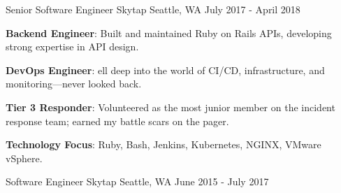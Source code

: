 \begin{cventries}
  \cventry
    {Senior Software Engineer} %
    {Skytap} %
    {Seattle, WA} %
    {July 2017 - April 2018} %
    {
      \begin{cvitems} %
        \item {\textbf{Backend Engineer}: Built and maintained Ruby on Rails APIs, developing strong expertise in API design.}
        \item {\textbf{DevOps Engineer}: ell deep into the world of CI/CD, infrastructure, and monitoring—never looked back.}
        \item {\textbf{Tier 3 Responder}: Volunteered as the most junior member on the incident response team; earned my battle scars on the pager.}
        \item {\textbf{Technology Focus}: Ruby, Bash, Jenkins, Kubernetes, NGINX, VMware vSphere.}
      \end{cvitems}
    }

  \cventry
    {Software Engineer} %
    {Skytap} %
    {Seattle, WA} %
    {June 2015 - July 2017} %
    {}

\end{cventries}
